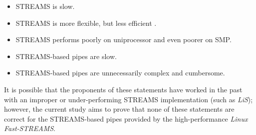 \documentclass[letterpaper,final,notitlepage,twocolumn,10pt,twoside]{article}
\begin{document}
\begin{itemize}

\item STREAMS is slow.

\item STREAMS is more flexible, but less efficient \cite[]{lkmlfaq}.

\item STREAMS performs poorly on uniprocessor and even poorer on SMP.

\item STREAMS-based pipes are slow.

\item STREAMS-based pipes are unnecessarily complex and cumbersome.

\end{itemize}

It is possible that the proponents of these statements have worked in the past
with an improper or under-performing STREAMS implementation (such as
\textsl{LiS}); however, the current study aims to prove that none of these
statements are correct for the STREAMS-based pipes provided by the
high-performance \textsl{Linux Fast-STREAMS}.
\end{document}
